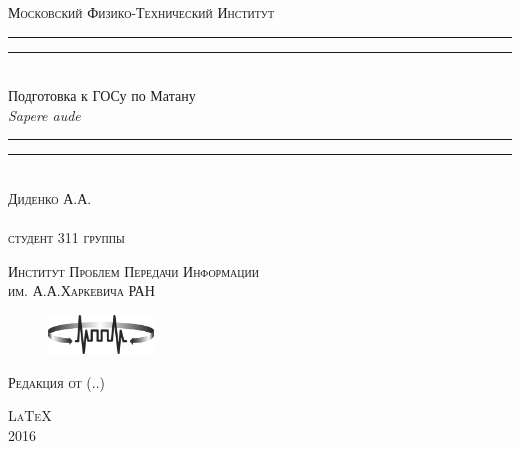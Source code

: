 \begin{titlepage}
\centering
\settowidth{\unitlength}{ПОДГОТОВКА К ГОСУ ПО МАТАНУ ыыыыыыыыыыыыыыыыыыыыыыыыыыыыыыыыыы}
\vspace*{\baselineskip}
{\LARGE\scshape Московский Физико-Технический Институт}\\[\baselineskip]
\rule{\unitlength}{1.6pt}\vspace*{-\baselineskip}\vspace*{2pt}
\rule{\unitlength}{0.4pt}\\[1.8\baselineskip]
{\Huge Подготовка к ГОСу по Матану}\\[\baselineskip]
{\large \itshape Sapere aude}\\[0.7\baselineskip]
\rule{\unitlength}{0.4pt}\vspace*{-\baselineskip}\vspace{3.2pt}
\rule{\unitlength}{1.6pt}\\[\baselineskip]
{\Large\scshape Диденко А.А. \\ $ $\\студент 311 группы}\par
\vspace*{5\baselineskip}  

{\LARGE\scshape Институт Проблем Передачи Информации \\им. А.А.Харкевича РАН}
\begin{figure}[!h]
\centering
\includegraphics[width=0.25\textwidth]{pictures/IITP2}
\end{figure}


{\LARGE\scshape Редакция от \currenttime \;(\twodigit\day.\twodigit\month.\the\year)}\par %
\vfill
{\LARGE\scshape \LaTeX}\\[\baselineskip]
{\LARGE\scshape 2016}\par
\end{titlepage}